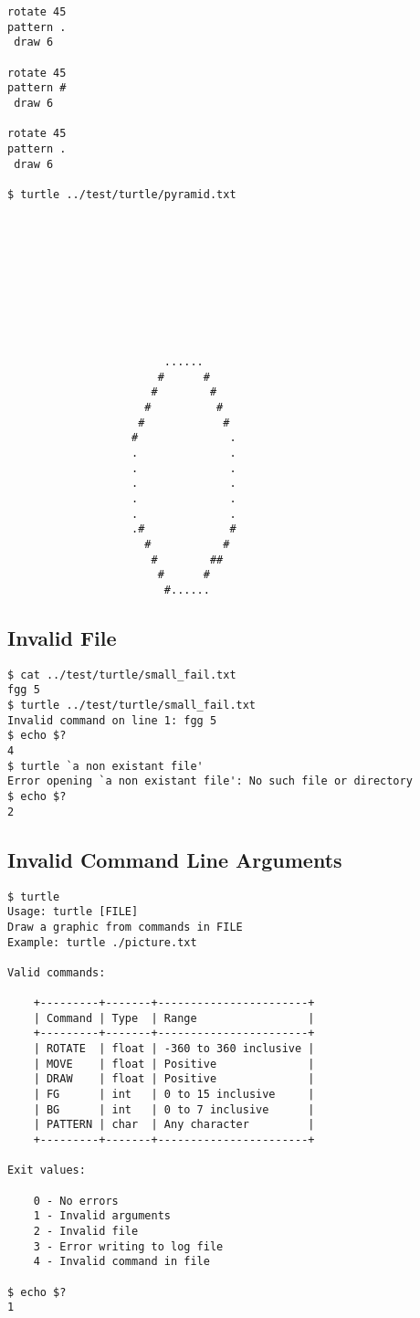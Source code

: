 \documentclass[a4paper, 12pt, titlepage]{article}
\begin{document}
\begin{lstlisting}
rotate 45
pattern .
 draw 6

rotate 45
pattern #
 draw 6

rotate 45
pattern .
 draw 6

$ turtle ../test/turtle/pyramid.txt










                        ......
                       #      #
                      #        #
                     #          #
                    #            #
                   #              .
                   .              .
                   .              .
                   .              .
                   .              .
                   .              .
                   .#             #
                     #           #
                      #        ##
                       #      #
                        #......
\end{lstlisting}

\subsection{Invalid File}

\begin{lstlisting}
$ cat ../test/turtle/small_fail.txt
fgg 5
$ turtle ../test/turtle/small_fail.txt
Invalid command on line 1: fgg 5
$ echo $?
4
$ turtle `a non existant file'
Error opening `a non existant file': No such file or directory
$ echo $?
2
\end{lstlisting}

\pagebreak
\subsection{Invalid Command Line Arguments}

\begin{lstlisting}
$ turtle
Usage: turtle [FILE]
Draw a graphic from commands in FILE
Example: turtle ./picture.txt

Valid commands:

    +---------+-------+-----------------------+
    | Command | Type  | Range                 |
    +---------+-------+-----------------------+
    | ROTATE  | float | -360 to 360 inclusive |
    | MOVE    | float | Positive              |
    | DRAW    | float | Positive              |
    | FG      | int   | 0 to 15 inclusive     |
    | BG      | int   | 0 to 7 inclusive      |
    | PATTERN | char  | Any character         |
    +---------+-------+-----------------------+

Exit values:

    0 - No errors
    1 - Invalid arguments
    2 - Invalid file
    3 - Error writing to log file
    4 - Invalid command in file

$ echo $?
1
\end{lstlisting}

\newpage
\end{document}
